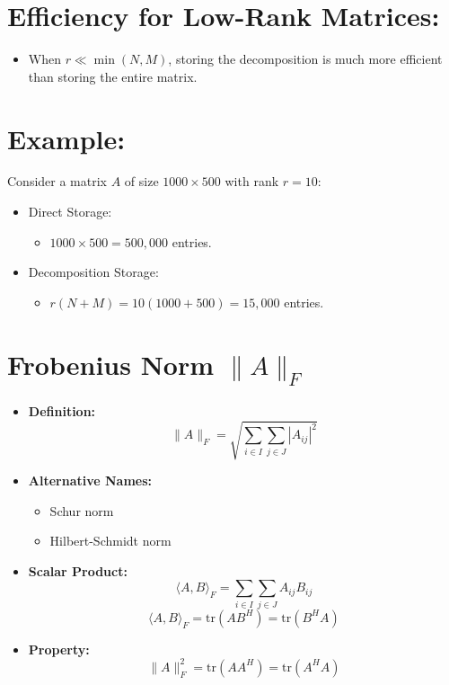 \documentclass{article}
\begin{document}
\section{Efficiency for Low-Rank Matrices:}

\begin{itemize}
    \item When $r \ll \min(N, M)$, storing the decomposition is much more efficient than storing the entire matrix.
\end{itemize}

\section*{Example:}

Consider a matrix $A$ of size $1000 \times 500$ with rank $r = 10$:

\begin{itemize}
    \item Direct Storage:
    \begin{itemize}
        \item $1000 \times 500 = 500,000$ entries.
    \end{itemize}
    
    \item Decomposition Storage:
    \begin{itemize}
        \item $r(N + M) = 10(1000 + 500) = 15,000$ entries.
    \end{itemize}
\end{itemize}









\section*{Frobenius Norm \( \| A \|_F \)}

\begin{itemize}
    \item \textbf{Definition:}
    \[
    \| A \|_F = \sqrt{\sum_{i \in I} \sum_{j \in J} |A_{ij}|^2}
    \]

    \item \textbf{Alternative Names:}
    \begin{itemize}
        \item Schur norm
        \item Hilbert-Schmidt norm
    \end{itemize}

    \item \textbf{Scalar Product:}
    \[
    \langle A, B \rangle_F = \sum_{i \in I} \sum_{j \in J} A_{ij} B_{ij}
    \]
    \[
    \langle A, B \rangle_F = \text{tr}(AB^H) = \text{tr}(B^H A)
    \]

    \item \textbf{Property:}
    \[
    \| A \|_F^2 = \text{tr}(AA^H) = \text{tr}(A^H A)
    \]
\end{itemize}
\end{document}
